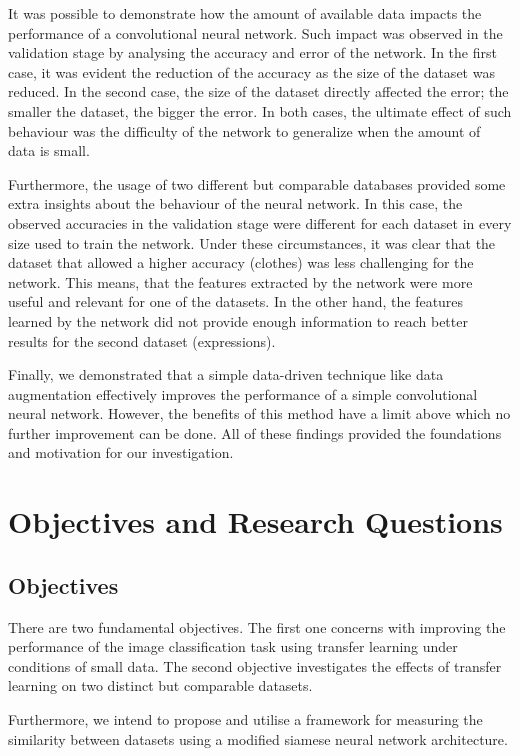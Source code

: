 \documentclass{article}
\begin{document}
It was possible to demonstrate how the amount of available data impacts the performance of a convolutional neural network. Such impact was observed in the validation stage by analysing the accuracy and error of the network. In the first case, it was evident the reduction of the accuracy as the size of the dataset was reduced. In the second case, the size of the dataset directly affected the error; the smaller the dataset, the bigger the error. In both cases, the ultimate effect of such behaviour was the difficulty of the network to generalize when the amount of data is small.

Furthermore, the usage of two different but comparable databases provided some extra insights about the behaviour of the neural network. In this case, the observed accuracies in the validation stage were different for each dataset in every size used to train the network. Under these circumstances, it was clear that the dataset that allowed a higher accuracy (clothes) was less challenging for the network. This means, that the features extracted by the network were more useful and relevant for one of the datasets. In the other hand, the features learned by the network did not provide enough information to reach better results for the second dataset (expressions).

Finally, we demonstrated that a simple data-driven technique like data augmentation effectively improves the performance of a simple convolutional neural network. However, the benefits of this method have a limit above which no further improvement can be done. All of these findings provided the foundations and motivation for our investigation.

\section{Objectives and Research Questions}
\label{sec:obj_questions}

\subsection{Objectives}
\label{sec:objectives}

There are two fundamental objectives. The first one concerns with improving the performance of the image classification task using transfer learning under conditions of small data. The second objective investigates the effects of transfer learning on two distinct but comparable datasets. 

Furthermore, we intend to propose and utilise a framework for measuring the similarity between datasets using a modified siamese neural network \cite{koch} architecture.
\end{document}
